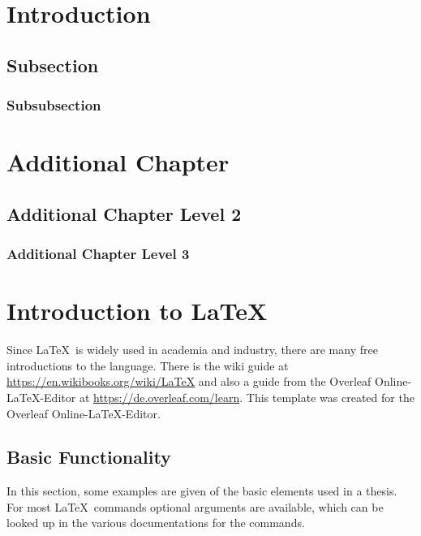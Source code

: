 \documentclass[11pt,a4paper]{article} %
\let\stdsection\section
\renewcommand\section{\clearpage\newpage\stdsection}
\begin{document}





\section{Introduction}
\subsection{Subsection}
\subsubsection{Subsubsection}

\section{Additional Chapter}
\subsection{Additional Chapter Level 2}
\subsubsection{Additional Chapter Level 3}

\section{Introduction to \LaTeX}
Since \LaTeX\ is widely used in academia and industry, there are many free introductions to the language. There is the wiki guide at \url{https://en.wikibooks.org/wiki/LaTeX} and also a guide from the Overleaf Online-LaTeX-Editor at \url{https://de.overleaf.com/learn}. This template was created for the Overleaf Online-LaTeX-Editor.

\subsection{Basic Functionality}
In this section, some examples are given of the basic elements used in a thesis.
For most \LaTeX\ commands optional arguments are available, which can be looked up in the various documentations for the commands.
\end{document}
